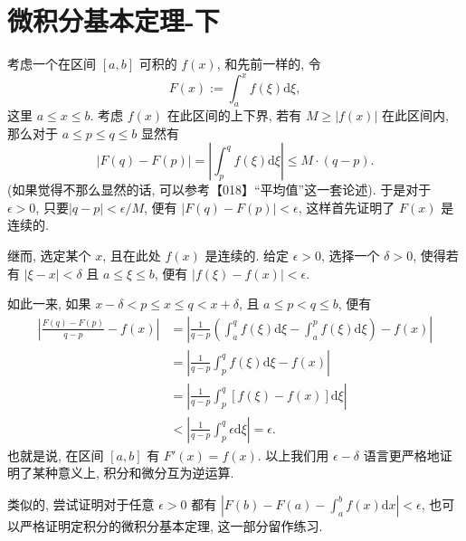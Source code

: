 \section{微积分基本定理-下}\label{019}

\begin{tcolorbox}[size=fbox, breakable, enhanced jigsaw, title={更加严格的版本 - 选读}]

考虑一个在区间 \([a,b]\) 可积的 \(f(x)\), 和先前一样的, 令 \[
F(x):=\int_a^xf(\xi)\mathrm{d}\xi,
\] 这里 \(a\le x \le b\). 考虑 \(f(x)\) 在此区间的上下界, 若有
\(M\ge |f(x)|\) 在此区间内, 那么对于 \(a\le p \le q \le b\) 显然有 \[
|F(q)-F(p)|=\left|\int_p^qf(\xi)\mathrm{d}\xi\right|\le M\cdot(q-p).
\] (如果觉得不那么显然的话, 可以参考【018】``平均值''这一套论述).
于是对于 \(\epsilon>0\), 只要\(|q-p|<\epsilon/M\), 便有
\(|F(q)-F(p)|<\epsilon\), 这样首先证明了 \(F(x)\) 是连续的.

继而, 选定某个 \(x\), 且在此处 \(f(x)\) 是连续的. 给定 \(\epsilon>0\),
选择一个 \(\delta>0\), 使得若有 \(|\xi-x|<\delta\) 且 \(a\le\xi\le b\),
便有 \(|f(\xi)-f(x)|<\epsilon\).

如此一来, 如果 \(x-\delta<p\le x\le q<x+\delta\), 且 \(a\le p<q\le b\),
便有 \[
\begin{aligned}
\left|\frac{F(q)-F(p)}{q-p}-f(x)\right|&=\left|\frac{1}{q-p}\left(\int_a^qf(\xi)\mathrm{d}\xi-\int_a^pf(\xi)\mathrm{d}\xi\right)-f(x)\right|\\
&=\left|\frac{1}{q-p}\int_p^qf(\xi)\mathrm{d}\xi-f(x)\right|\\
&=\left|\frac{1}{q-p}\int_p^q[f(\xi)-f(x)]\mathrm{d}\xi\right|\\
&<\left|\frac{1}{q-p}\int_p^q\epsilon\mathrm{d}\xi\right|=\epsilon.
\end{aligned}
\] 也就是说, 在区间 \([a,b]\) 有 \(F'(x)=f(x)\). 以上我们用
\(\epsilon-\delta\) 语言更严格地证明了某种意义上, 积分和微分互为逆运算.

类似的, 尝试证明对于任意 \(\epsilon>0\) 都有
\(\left|F(b)-F(a)-\int_a^bf(x)\mathrm{d}x\right|<\epsilon\),
也可以严格证明定积分的微积分基本定理, 这一部分留作练习.

\end{tcolorbox}

